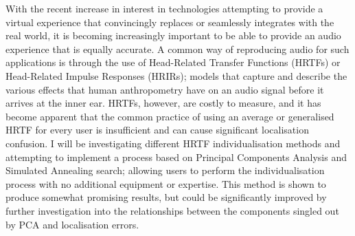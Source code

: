 With the recent increase in interest in technologies attempting to provide a virtual experience that convincingly replaces or seamlessly integrates with the real world, it is becoming increasingly important to be able to provide an audio experience that is equally accurate. A common way of reproducing audio for such applications is through the use of Head-Related Transfer Functions (HRTFs) or Head-Related Impulse Responses (HRIRs); models that capture and describe the various effects that human anthropometry have on an audio signal before it arrives at the inner ear. HRTFs, however, are costly to measure, and it has become apparent that the common practice of using an average or generalised HRTF for every user is insufficient and can cause significant localisation confusion. I will be investigating different HRTF individualisation methods and attempting to implement a process based on Principal Components Analysis and Simulated Annealing search; allowing users to perform the individualisation process with no additional equipment or expertise. This method is shown to produce somewhat promising results, but could be significantly improved by further investigation into the relationships between the components singled out by PCA and localisation errors. 